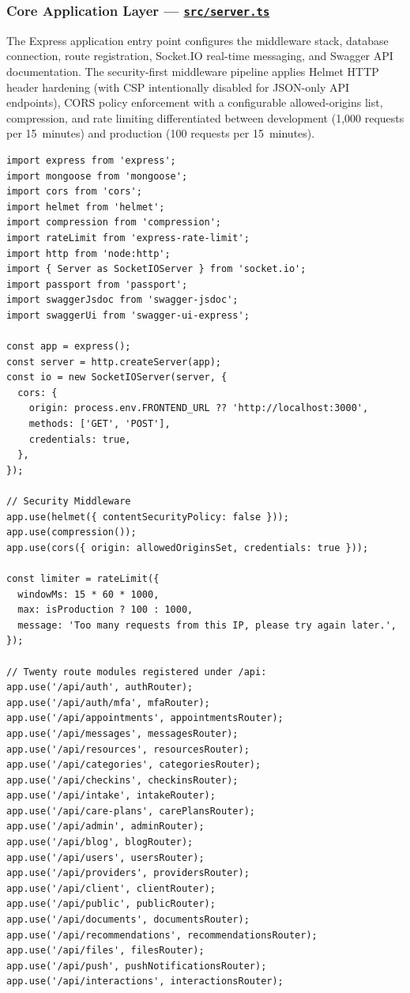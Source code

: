 \documentclass[12pt,letterpaper]{article}
\newcommand{\ghrepo}{https://github.com/omniV1/lunaraCare}
\begin{document}
\subsubsection{Core Application Layer --- \href{\ghrepo/blob/main/backend/src/server.ts}{\texttt{src/server.ts}}}

The Express application entry point configures the middleware stack, database connection, route registration, Socket.IO real-time messaging, and Swagger API documentation. The security-first middleware pipeline applies Helmet HTTP header hardening (with CSP intentionally disabled for JSON-only API endpoints), CORS policy enforcement with a configurable allowed-origins list, compression, and rate limiting differentiated between development (1,000 requests per 15~minutes) and production (100 requests per 15~minutes).

\begin{lstlisting}[caption={Server initialization, security middleware, and API route registration (\texttt{server.ts})}]
import express from 'express';
import mongoose from 'mongoose';
import cors from 'cors';
import helmet from 'helmet';
import compression from 'compression';
import rateLimit from 'express-rate-limit';
import http from 'node:http';
import { Server as SocketIOServer } from 'socket.io';
import passport from 'passport';
import swaggerJsdoc from 'swagger-jsdoc';
import swaggerUi from 'swagger-ui-express';

const app = express();
const server = http.createServer(app);
const io = new SocketIOServer(server, {
  cors: {
    origin: process.env.FRONTEND_URL ?? 'http://localhost:3000',
    methods: ['GET', 'POST'],
    credentials: true,
  },
});

// Security Middleware
app.use(helmet({ contentSecurityPolicy: false }));
app.use(compression());
app.use(cors({ origin: allowedOriginsSet, credentials: true }));

const limiter = rateLimit({
  windowMs: 15 * 60 * 1000,
  max: isProduction ? 100 : 1000,
  message: 'Too many requests from this IP, please try again later.',
});

// Twenty route modules registered under /api:
app.use('/api/auth', authRouter);
app.use('/api/auth/mfa', mfaRouter);
app.use('/api/appointments', appointmentsRouter);
app.use('/api/messages', messagesRouter);
app.use('/api/resources', resourcesRouter);
app.use('/api/categories', categoriesRouter);
app.use('/api/checkins', checkinsRouter);
app.use('/api/intake', intakeRouter);
app.use('/api/care-plans', carePlansRouter);
app.use('/api/admin', adminRouter);
app.use('/api/blog', blogRouter);
app.use('/api/users', usersRouter);
app.use('/api/providers', providersRouter);
app.use('/api/client', clientRouter);
app.use('/api/public', publicRouter);
app.use('/api/documents', documentsRouter);
app.use('/api/recommendations', recommendationsRouter);
app.use('/api/files', filesRouter);
app.use('/api/push', pushNotificationsRouter);
app.use('/api/interactions', interactionsRouter);
\end{lstlisting}
\end{document}

